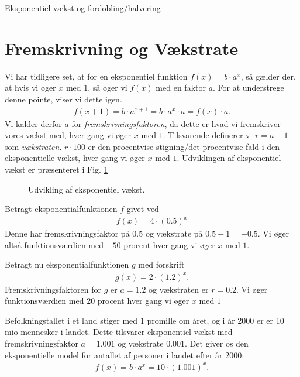 \begin{center}
\Huge
Eksponentiel vækst og fordobling/halvering
\end{center}
\section*{Fremskrivning og Vækstrate}
Vi har tidligere set, at for en eksponentiel funktion $f(x) = b\cdot a^x$, så gælder der, at hvis vi øger $x$ med $1$, så øger vi $f(x)$ med en faktor $a$. For at understrege denne pointe, viser vi dette igen.
\begin{align*}
f(x+1) = b\cdot a^{x+1} = b\cdot a^x\cdot a = f(x)\cdot a.
\end{align*}
Vi kalder derfor $a$ for \textit{fremskrivningsfaktoren}, da dette er hvad vi fremskriver vores vækst med, hver gang vi øger $x$ med $1$. Tilsvarende definerer vi $r = a-1$ som \textit{vækstraten}. $r\cdot 100$ er den procentvise stigning/det procentvise fald i den eksponentielle vækst, hver gang vi øger $x$ med $1$. Udviklingen af eksponentiel vækst er præsenteret i Fig. \ref{fig:sildegen}
\begin{figure}[H]
\center
{}
\caption{Udvikling af eksponentiel vækst.}
\label{fig:sildegen}
\end{figure}
\begin{exa}
Betragt eksponentialfunktionen $f$ givet ved
\begin{align*}
f(x) = 4\cdot(0.5)^x
\end{align*}
Denne har fremskrivningsfaktor på $0.5$ og vækstrate på $0.5-1 = -0.5$. Vi øger altså funktionsværdien med $-50$ procent hver gang vi øger $x$ med $1$. 

Betragt nu eksponentialfunktionen $g$ med forskrift
\begin{align*}
g(x) = 2\cdot (1.2)^x.
\end{align*}
Fremskrivningsfaktoren for $g$ er $a = 1.2$ og vækstraten er $r= 0.2$. Vi øger funktionsværdien med $20$ procent hver gang vi øger $x$ med $1$ 
\end{exa}
\begin{exa}
Befolkningstallet i et land stiger med 1 promille om året, og i år 2000 er er 10 mio mennesker i landet. Dette tilsvarer eksponentiel vækst med fremskrivningsfaktor $a = 1.001$ og vækstrate $0.001$. Det giver os den eksponentielle model for antallet af personer i landet efter år 2000:
\begin{align*}
f(x) = b\cdot a^x = 10\cdot (1.001)^x.
\end{align*}
\end{exa}
